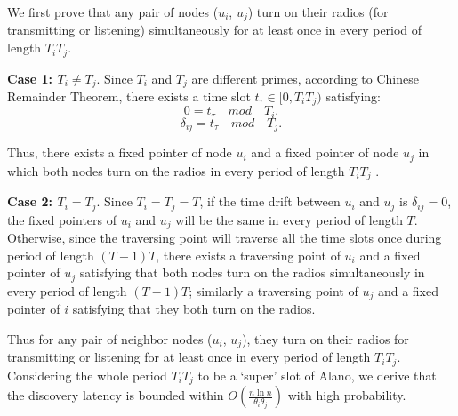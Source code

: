 \begin{IEEEproof}
We first prove that any pair of nodes ($u_i$, $u_j$) turn on their radios (for transmitting or listening) simultaneously for at least once in every period of length $T_iT_j$.

\textbf{Case 1: $T_i \neq T_j$}. Since $T_i$ and $T_j$ are different primes,
according to Chinese Remainder Theorem\cite{ding1996chinese}, there exists a time slot $t_\tau \in \lbrack 0,T_iT_j ) $ satisfying:
\begin{equation}
\label{case1.1}
0 = t_\tau  \quad mod \quad  T_i.
\end{equation}
\begin{equation}
\label{case1.2}
\delta_{ij} = t_\tau  \quad mod \quad  T_j.
\end{equation}

Thus, there exists a fixed pointer of node $u_i$
and a fixed pointer of node $u_j$ in which both nodes turn on the radios in every period of length $T_iT_j$  .

\textbf{Case 2: $T_i = T_j$}. Since $T_i = T_j = T$, if the time drift between $u_i$ and $u_j$ is $\delta_{ij} = 0$, the fixed pointers of $u_i$ and $u_j$ will be the same in every period of length $T$.
Otherwise, since the traversing point will traverse all the time slots once during period of length $(T-1)T$,
there exists a traversing point of $u_i$ and a fixed pointer
of $u_j$ satisfying that both nodes turn on the radios simultaneously in every period of length $(T-1)T$; similarly a traversing point of $u_j$ and a fixed pointer of $i$ satisfying that they both turn on the radios.

Thus for any pair of neighbor nodes ($u_i$, $u_j$), they turn on their radios for transmitting or listening for at least once in every period of length $T_iT_j$. Considering
the whole period $T_iT_j$ to be a `super' slot of Alano, we derive that the discovery latency is bounded within $O(\frac{n\ln n}{\theta_i\theta_j})$ with high probability.
\end{IEEEproof}






